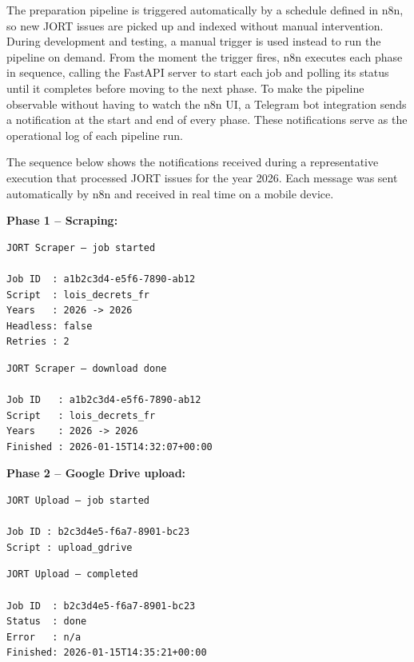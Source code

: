 The preparation pipeline is triggered automatically by a schedule defined in n8n, so new \ac{JORT} issues are picked up and indexed without manual intervention. During development and testing, a manual trigger is used instead to run the pipeline on demand. From the moment the trigger fires, n8n executes each phase in sequence, calling the FastAPI server to start each job and polling its status until it completes before moving to the next phase. To make the pipeline observable without having to watch the n8n UI, a Telegram bot integration sends a notification at the start and end of every phase. These notifications serve as the operational log of each pipeline run.

\vspace{0.5em}

The sequence below shows the notifications received during a representative execution that processed \ac{JORT} issues for the year 2026. Each message was sent automatically by n8n and received in real time on a mobile device.

\vspace{0.5em}

\noindent\textbf{Phase 1 -- Scraping:}

\vspace{0.3em}
\noindent
\begin{minipage}[t]{0.48\textwidth}
\small
\begin{verbatim}
JORT Scraper — job started

Job ID  : a1b2c3d4-e5f6-7890-ab12
Script  : lois_decrets_fr
Years   : 2026 -> 2026
Headless: false
Retries : 2
\end{verbatim}
\end{minipage}
\hfill
\begin{minipage}[t]{0.48\textwidth}
\small
\begin{verbatim}
JORT Scraper — download done

Job ID   : a1b2c3d4-e5f6-7890-ab12
Script   : lois_decrets_fr
Years    : 2026 -> 2026
Finished : 2026-01-15T14:32:07+00:00
\end{verbatim}
\end{minipage}

\vspace{0.8em}
\noindent\textbf{Phase 2 -- Google Drive upload:}

\vspace{0.3em}
\noindent
\begin{minipage}[t]{0.48\textwidth}
\small
\begin{verbatim}
JORT Upload — job started

Job ID : b2c3d4e5-f6a7-8901-bc23
Script : upload_gdrive
\end{verbatim}
\end{minipage}
\hfill
\begin{minipage}[t]{0.48\textwidth}
\small
\begin{verbatim}
JORT Upload — completed

Job ID  : b2c3d4e5-f6a7-8901-bc23
Status  : done
Error   : n/a
Finished: 2026-01-15T14:35:21+00:00
\end{verbatim}
\end{minipage}

